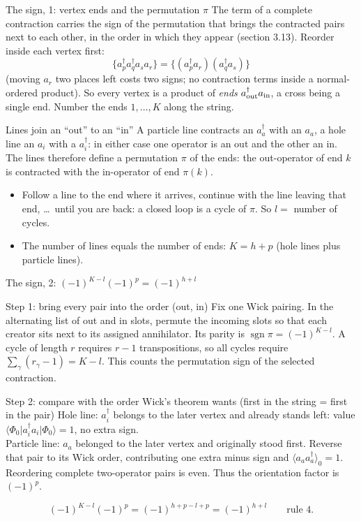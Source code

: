\documentclass[aspectratio=169,10pt]{beamer}
\newcommand{\mel}[3]{\langle #1\lvert #2\rvert #3\rangle}
\newcommand{\av}[1]{\langle #1\rangle_0}
\newcommand{\cre}[1]{a_{#1}^{\dagger}}
\newcommand{\ann}[1]{a_{#1}}
\newcommand{\no}[1]{\bigl\{#1\bigr\}}
\newcommand{\ph}{\Phi_0}
\begin{document}
\begin{frame}[shrink=8]{The sign, 1: vertex ends and the permutation \(\pi\)}
The term of a complete contraction carries the sign of the permutation that brings the contracted pairs next to each other, in the order in which they appear (section 3.13). Reorder inside each vertex first:
\[
\no{\cre{p}\cre{q}\ann{s}\ann{r}}=\no{(\cre{p}\ann{r})(\cre{q}\ann{s})}
\]
(moving \(\ann{r}\) two places left costs two signs; no contraction terms inside a normal-ordered product). So every vertex is a product of \emph{ends} \(\cre{\rm out}\ann{\rm in}\), a cross being a single end. Number the ends \(1,\dots,K\) along the string.
\begin{block}{Lines join an ``out'' to an ``in''}
A particle line contracts an \(\cre{a}\) with an \(\ann{a}\), a hole line an \(\ann{i}\) with a \(\cre{i}\): in either case one operator is an out and the other an in. The lines therefore define a \alert{permutation \(\pi\) of the ends}: the out-operator of end \(k\) is contracted with the in-operator of end \(\pi(k)\).
\end{block}
\begin{itemize}
\item Follow a line to the end where it arrives, continue with the line leaving that end, \dots\ until you are back: a \alert{closed loop} is a \alert{cycle of \(\pi\)}. So \(l=\) number of cycles.
\item The number of lines equals the number of ends: \(K=h+p\) (hole lines plus particle lines).
\end{itemize}
\end{frame}

\begin{frame}[shrink=5]{The sign, 2: \((-1)^{K-l}(-1)^{p}=(-1)^{h+l}\)}
\begin{block}{Step 1: bring every pair into the order (out, in)}
Fix one Wick pairing. In the alternating list of out and in slots, permute the incoming slots so that each creator sits next to its assigned annihilator. Its parity is $\operatorname{sgn}\pi=(-1)^{K-l}$. A cycle of length $r$ requires $r-1$ transpositions, so all cycles require $\sum_\gamma(r_\gamma-1)=K-l$. This counts the permutation sign of the selected contraction.
\end{block}
\begin{block}{Step 2: compare with the order Wick's theorem wants (first in the string = first in the pair)}
Hole line: \(\cre{i}\) belongs to the later vertex and already stands left: value \(\mel{\ph}{\cre{i}\ann{i}}{\ph}=1\), no extra sign.\\
Particle line: $\ann{a}$ belonged to the later vertex and originally stood first. Reverse that pair to its Wick order, contributing one extra minus sign and $\av{\ann{a}\cre{a}}=1$. Reordering complete two-operator pairs is even. Thus the orientation factor is $(-1)^p$.
\end{block}
\[
\boxed{(-1)^{K-l}(-1)^{p}=(-1)^{h+p-l+p}=(-1)^{h+l}}\qquad\text{rule 4.}
\]
\end{frame}
\end{document}
